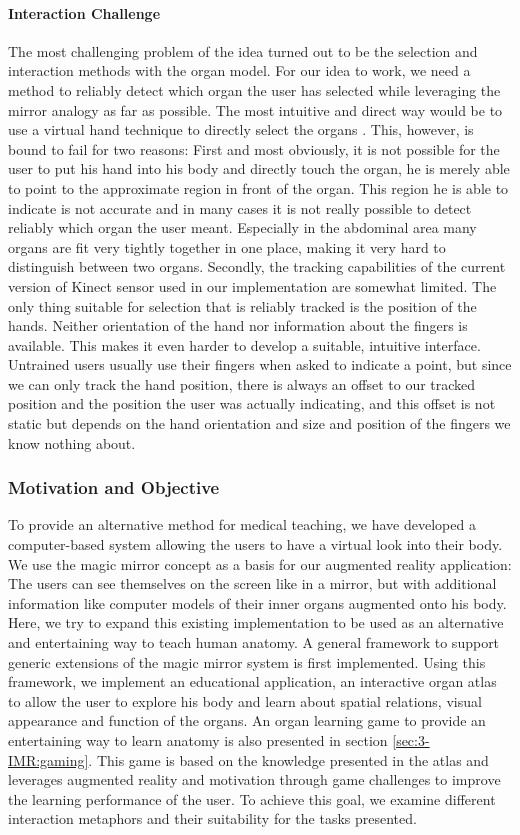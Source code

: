 \paragraph{Interaction Challenge}
The most challenging problem of the idea turned out to be the selection and interaction methods with the organ model. For our idea to work, we need a method to reliably detect which organ the user has selected while leveraging the mirror analogy as far as possible. The most intuitive and direct way would be to use a virtual hand technique to directly select the organs \cite{Ha2010}. This, however, is bound to fail for two reasons:
First and most obviously, it is not possible for the user to put his hand into his body and directly touch the organ, he is merely able to point to the approximate region in front of the organ. This region he is able to indicate is not accurate and in many cases it is not really possible to detect reliably which organ the user meant. Especially in the abdominal area many organs are fit very tightly together in one place, making it very hard to distinguish between two organs.
Secondly, the tracking capabilities of the current version of Kinect sensor used in our implementation are somewhat limited. The only thing suitable for selection that is reliably tracked is the position of the hands. Neither orientation of the hand nor information about the fingers is available. This makes it even harder to develop a suitable, intuitive interface. Untrained users usually use their fingers when asked to indicate a point, but since we can only track the hand position, there is always an offset to our tracked position and the position the user was actually indicating, and this offset is not static but depends on the hand orientation and size and position of the fingers we know nothing about.

\subsubsection{Motivation and Objective}
To provide an alternative method for medical teaching, we have developed a computer-based system allowing the users to have a virtual look into their body. We use the magic mirror concept as a basis for our augmented reality application: The users can see themselves on the screen like in a mirror, but with additional information like computer models of their inner organs augmented onto his body. Here, we try to expand this existing implementation to be used as an alternative and entertaining way to teach human anatomy. A general framework to support generic extensions of the magic mirror system is first implemented. Using this framework, we implement an educational application, an interactive organ atlas to allow the user to explore his body and learn about spatial relations, visual appearance and function of the organs. An organ learning game to provide an entertaining way to learn anatomy is also presented in section \ref{sec:3-IMR:gaming}. This game is based on the knowledge presented in the atlas and leverages augmented reality and motivation through game challenges to improve the learning performance of the user. To achieve this goal, we examine different interaction metaphors and their suitability for the tasks presented.

